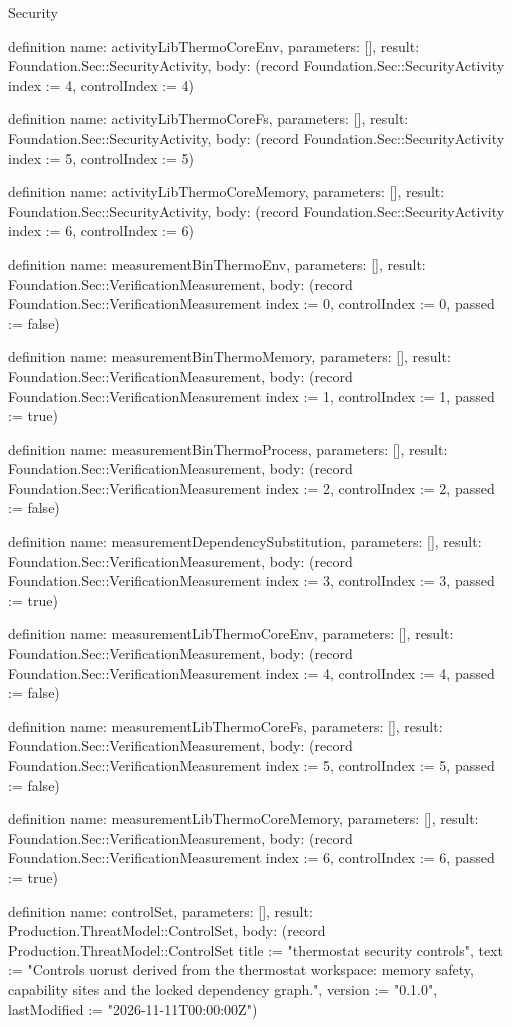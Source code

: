 \begin{lexlean}{Security}
\begin{semanticmodule}
definition{
  name: activityLibThermoCoreEnv,
  parameters: [],
  result: Foundation.Sec::SecurityActivity,
  body: (record Foundation.Sec::SecurityActivity {index := 4, controlIndex := 4})
}

definition{
  name: activityLibThermoCoreFs,
  parameters: [],
  result: Foundation.Sec::SecurityActivity,
  body: (record Foundation.Sec::SecurityActivity {index := 5, controlIndex := 5})
}

definition{
  name: activityLibThermoCoreMemory,
  parameters: [],
  result: Foundation.Sec::SecurityActivity,
  body: (record Foundation.Sec::SecurityActivity {index := 6, controlIndex := 6})
}

definition{
  name: measurementBinThermoEnv,
  parameters: [],
  result: Foundation.Sec::VerificationMeasurement,
  body: (record Foundation.Sec::VerificationMeasurement {index := 0, controlIndex := 0, passed := false})
}

definition{
  name: measurementBinThermoMemory,
  parameters: [],
  result: Foundation.Sec::VerificationMeasurement,
  body: (record Foundation.Sec::VerificationMeasurement {index := 1, controlIndex := 1, passed := true})
}

definition{
  name: measurementBinThermoProcess,
  parameters: [],
  result: Foundation.Sec::VerificationMeasurement,
  body: (record Foundation.Sec::VerificationMeasurement {index := 2, controlIndex := 2, passed := false})
}

definition{
  name: measurementDependencySubstitution,
  parameters: [],
  result: Foundation.Sec::VerificationMeasurement,
  body: (record Foundation.Sec::VerificationMeasurement {index := 3, controlIndex := 3, passed := true})
}

definition{
  name: measurementLibThermoCoreEnv,
  parameters: [],
  result: Foundation.Sec::VerificationMeasurement,
  body: (record Foundation.Sec::VerificationMeasurement {index := 4, controlIndex := 4, passed := false})
}

definition{
  name: measurementLibThermoCoreFs,
  parameters: [],
  result: Foundation.Sec::VerificationMeasurement,
  body: (record Foundation.Sec::VerificationMeasurement {index := 5, controlIndex := 5, passed := false})
}

definition{
  name: measurementLibThermoCoreMemory,
  parameters: [],
  result: Foundation.Sec::VerificationMeasurement,
  body: (record Foundation.Sec::VerificationMeasurement {index := 6, controlIndex := 6, passed := true})
}

definition{
  name: controlSet,
  parameters: [],
  result: Production.ThreatModel::ControlSet,
  body: (record Production.ThreatModel::ControlSet {title := "thermostat security controls", text := "Controls uorust derived from the thermostat workspace: memory safety, capability sites and the locked dependency graph.", version := "0.1.0", lastModified := "2026-11-11T00:00:00Z"})
}


\end{semanticmodule}
\end{lexlean}
